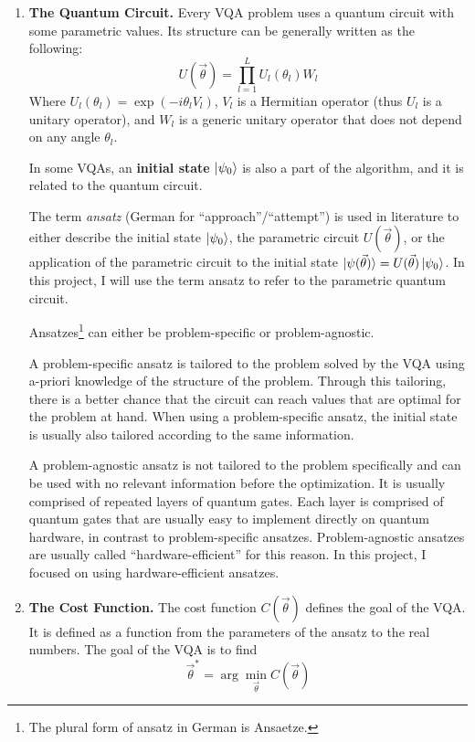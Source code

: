 \documentclass[a4paper,12pt]{article}
\newcommand{\thetas}{\vec{\theta}}
\begin{document}
\begin{enumerate}
    \item \textbf{The Quantum Circuit.} Every VQA problem uses a quantum circuit with some parametric values.
    Its structure can be generally written as the following:
    \begin{equation}
        U(\thetas) = \prod_{l=1}^{L} U_l(\theta_l) W_l
    \end{equation}
    Where $U_l(\theta_l) = \exp(-i\theta_l V_l)$, $V_l$ is a Hermitian operator (thus $U_l$ is a unitary operator), and $W_l$ is a generic unitary operator that does not depend on any angle $\theta_l$.
    
    In some VQAs, an \textbf{initial state} $\ket{\psi_0}$ is also a part of the algorithm, and it is related to the quantum circuit.

    The term \emph{ansatz} (German for ``approach''/``attempt'') is used in literature to either describe the initial state $\ket{\psi_0}$, the parametric circuit $U(\thetas)$, or the application of the parametric circuit to the initial state $\ket{\psi(\thetas)} = U(\thetas)\ket{\psi_0}$.
    In this project, I will use the term ansatz to refer to the parametric quantum circuit.

    Ansatzes\footnote{The plural form of ansatz in German is Ansaetze.} can either be problem-specific or problem-agnostic.

    A problem-specific ansatz is tailored to the problem solved by the VQA using a-priori knowledge of the structure of the problem. Through this tailoring, there is a better chance that the circuit can reach values that are optimal for the problem at hand. When using a problem-specific ansatz, the initial state is usually also tailored according to the same information.
    
    A problem-agnostic ansatz is not tailored to the problem specifically and can be used with no relevant information before the optimization. It is usually comprised of repeated layers of quantum gates. Each layer is comprised of quantum gates that are usually easy to implement directly on quantum hardware, in contrast to problem-specific ansatzes. Problem-agnostic ansatzes are usually called ``hardware-efficient'' for this reason.
    In this project, I focused on using hardware-efficient ansatzes.
    
    \item \textbf{The Cost Function.} The cost function $C(\thetas)$ defines the goal of the VQA. It is defined as a function from the parameters of the ansatz to the real numbers.
    The goal of the VQA is to find
    \begin{equation}
        \thetas^* = \arg\min_{\thetas} C(\thetas)
    \end{equation}


\end{enumerate}
\end{document}
